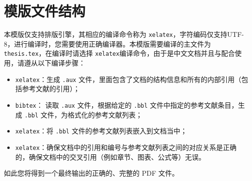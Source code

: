 \section{模版文件结构}

本模版仅支持排版引擎，其相应的编译命令称为 \texttt{xelatex}，字符编码仅支持UTF-8，进行编译时，您需要使用正确编译器。本模版需要编译的主文件为 \texttt{thesis.tex}，在编译时请选择 \texttt{xelatex}编译命令，由于是中文文档并且与配合使用，请遵从以下编译步骤：

\begin{itemize}
    \item \texttt{xelatex}：生成 \texttt{.aux} 文件，里面包含了文档的结构信息和所有的内部引用（包括参考文献的引用）；
    \item \texttt{bibtex}： 读取 \texttt{.aux} 文件，根据给定的 \texttt{.bbl}  文件中指定的参考文献条目，生成 \texttt{.bbl} 文件，为格式化的参考文献列表；
    \item \texttt{xelatex}：将 \texttt{.bbl} 文件的参考文献列表嵌入到文档当中；
    \item \texttt{xelatex}：确保文档中的引用和编号与参考文献列表之间的对应关系是正确的，确保文档中的交叉引用（例如章节、图表、公式等）无误。
\end{itemize}
如此您将得到一个最终输出的正确的、完整的 PDF 文件。

